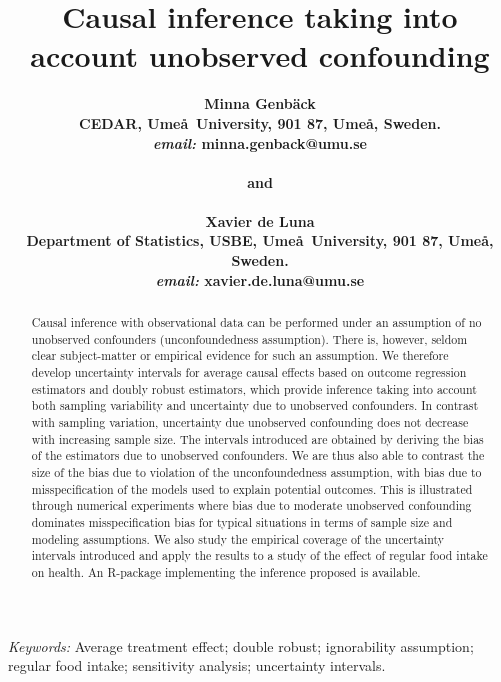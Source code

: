 \documentclass[11pt]{article}
\title{Causal inference taking into account unobserved confounding}
\author
{\bf{Minna Genb\"ack}  \\
CEDAR, Ume\aa \, University, 901 87, Ume\aa, Sweden. \\
\textit{email:} minna.genback@umu.se\\
\\
\bf{and}\\
\\
\bf{Xavier de Luna} \\
Department of Statistics, USBE, Ume\aa \, University, 901 87, Ume\aa, Sweden.\\
\textit{email:} xavier.de.luna@umu.se}
\begin{document}
\date{}
\maketitle
\begin{abstract}
\noindent Causal inference with observational data can be performed under an assumption of no unobserved confounders (unconfoundedness assumption). There is, however, seldom clear subject-matter or empirical evidence for such an
assumption. We therefore develop uncertainty intervals for average causal effects based on outcome regression estimators and doubly robust estimators,
which provide inference taking into account both sampling variability and uncertainty due to unobserved confounders. In contrast with sampling variation, uncertainty due unobserved confounding does not decrease with increasing sample size.
The intervals introduced
are obtained by deriving the bias of the estimators due to unobserved confounders. We are thus also able to contrast the size of the bias due to violation of the unconfoundedness assumption, with bias due to misspecification of the models used to explain potential outcomes. 
This is illustrated through numerical experiments where bias due to moderate unobserved confounding dominates misspecification bias for typical situations in terms of sample size and modeling assumptions. We also study the empirical coverage of the uncertainty intervals introduced and apply the results to a study of the effect of regular food intake on health. An R-package implementing the inference proposed is available.
\end{abstract}

%

\textit{Keywords:} Average treatment effect; double robust; ignorability assumption; regular food intake; sensitivity analysis; uncertainty intervals.





\end{document}
